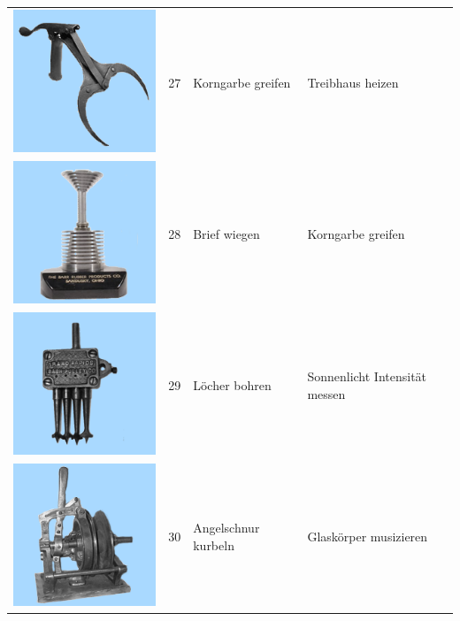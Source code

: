 \documentclass[
  english,
  doc,12pt,twoside,floatsintext]{apa7}
\begin{document}
\begin{center}
\begin{ThreePartTable}
\begin{longtable}{llll}
\includegraphics[valign=c, scale=0.19]{../materials/unfamiliar/27.png} & 27 & Korngarbe greifen & Treibhaus heizen\\
\includegraphics[valign=c, scale=0.19]{../materials/unfamiliar/28.png} & 28 & Brief wiegen & Korngarbe greifen\\
\includegraphics[valign=c, scale=0.19]{../materials/unfamiliar/29.png} & 29 & Löcher bohren & Sonnenlicht Intensität messen\\
\includegraphics[valign=c, scale=0.19]{../materials/unfamiliar/30.png} & 30 & Angelschnur kurbeln & Glaskörper musizieren\\

\end{longtable}
\end{ThreePartTable}
\end{center}
\end{document}
